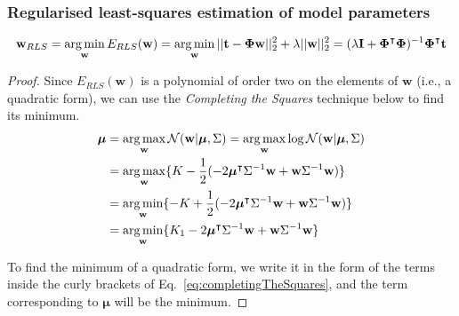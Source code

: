 \begin{frame}
    \frametitle{Regularised least-squares estimation of model parameters}
	\scriptsize
	\begin{claim}
		\begin{align*}
			\mathbf{w}_{RLS}=\operatorname*{arg\,min}_{\mathbf{w}}E_{RLS}(\mathbf{w})=\operatorname*{arg\,min}_{\mathbf{w}}||\mathbf{t}-\boldsymbol{\Phi}\mathbf{w}||_2^2+\lambda||\mathbf{w}||_2^2=(\lambda\mathbf{I}+\boldsymbol{\Phi}^\intercal\boldsymbol{\Phi})^{-1}\boldsymbol{\Phi}^\intercal\mathbf{t}
		\end{align*}
	\end{claim}
	\tiny
	\begin{proof}
		Since $E_{RLS}(\mathbf{w})$ is a polynomial of order two on the elements of $\mathbf{w}$ (i.e., a quadratic form), we can use the \emph{Completing the Squares} technique below to find its minimum.
		\begin{align}
			\boldsymbol{\mu}&=\operatorname*{arg\,max}_{\mathbf{w}}\mathcal{N}(\mathbf{w}|\boldsymbol{\mu},\Sigma)=\operatorname*{arg\,max}_{\mathbf{w}}\log\mathcal{N}(\mathbf{w}|\boldsymbol{\mu},\Sigma)\nonumber\\
                            &=\operatorname*{arg\,max}_{\mathbf{w}}\{K-\frac{1}{2}(-2\boldsymbol{\mu}^\intercal\Sigma^{-1}\mathbf{w}+\mathbf{w}\Sigma^{-1}\mathbf{w})\}\label{eq:completingTheSquaresStep2}\\
                            &=\operatorname*{arg\,min}_{\mathbf{w}}\{-K+\frac{1}{2}(-2\boldsymbol{\mu}^\intercal\Sigma^{-1}\mathbf{w}+\mathbf{w}\Sigma^{-1}\mathbf{w})\}\nonumber\\
                            &=\operatorname*{arg\,min}_{\mathbf{w}}\{K_1-2\boldsymbol{\mu}^\intercal\Sigma^{-1}\mathbf{w}+\mathbf{w}\Sigma^{-1}\mathbf{w}\}\label{eq:completingTheSquares}
		\end{align}


		To find the minimum of a quadratic form, we write it in the form of the
terms inside the curly brackets of Eq.~\ref{eq:completingTheSquares}, and the
term corresponding to $\boldsymbol{\mu}$ will be the minimum.

		\phantom\qedhere
	\end{proof}
	\normalsize
\end{frame}

